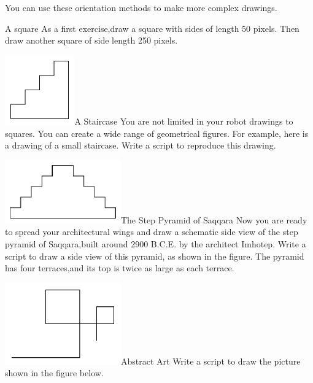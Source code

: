 \documentclass[a4paper,10pt,twoside]{book}
\begin{document}
You can use these orientation methods to make more complex drawings. 

\begin{exonofigtitle}{A square}\label{xp:square}
As a first exercise,draw a square with sides of length 50 pixels. Then draw another square of side length 250 pixels. 
\end{exonofigtitle}


\begin{exofigwithsize}[0.5]{\includegraphics[width=3cm]{turtleMSmallStairs}}{A Staircase}\label{xp:letterA}
You are not limited in your robot drawings to squares. You can create a wide range of geometrical figures.
For example, here is a drawing of a small staircase. Write a script to reproduce this drawing. 
\end{exofigwithsize}


\begin{exofigwithsize}[0.5]{\includegraphics[width=5cm]{turtleMSaqqarah}}{The Step Pyramid of Saqqara}\label{xp:saqq}
Now you are ready to spread your architectural wings and draw a schematic side view of the step pyramid of 
Saqqara,built around 2900 B.C.E. by the architect Imhotep. Write a script to draw a side view of this pyramid, 
as shown in the figure. The pyramid has four terraces,and its top is twice as large as each terrace. 
\end{exofigwithsize}

\begin{exofigwithsize}[0.5]{\includegraphics[width=5cm]{turtleMArtNouveau}}{Abstract Art}\label{xp:art}
Write a script to draw the picture shown in the figure below. 
\end{exofigwithsize}
\end{document}
